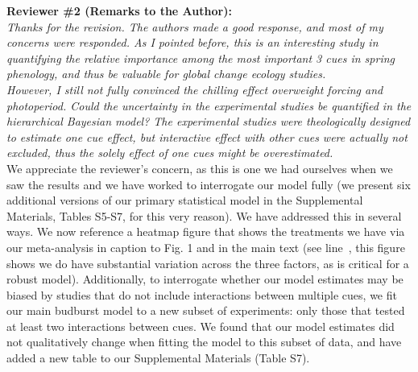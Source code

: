 \documentclass{article}
\newcommand{\lr}[1]{line~\lineref{#1}}
\begin{document}
{\bf Reviewer \#2 (Remarks to the Author):}\\

\emph{Thanks for the revision. The authors made a good response, and most of my concerns were responded. As I pointed before, this is an interesting study in quantifying the relative importance among the most important 3 cues in spring phenology, and thus be valuable for global change ecology studies. }\\


\emph{However, I still not fully convinced the chilling effect overweight forcing and photoperiod. Could the uncertainty in the experimental studies be quantified in the hierarchical Bayesian model? The experimental studies were theologically designed to estimate one cue effect, but interactive effect with other cues were actually not excluded, thus the solely effect of one cues might be overestimated.}\\ 


We appreciate the reviewer's concern, as this is one we had ourselves when we saw the results and we have worked to interrogate our model fully (we present six additional versions of our primary statistical model in the Supplemental Materials, Tables S5-S7, for this very reason). We have addressed this in several ways. We now reference a heatmap figure that shows the treatments we have via our meta-analysis in  caption to Fig. 1 and in the main text (see \lr{heatmap}, this figure shows we do have substantial variation across the three factors, as is critical for a robust model). Additionally, to interrogate whether our model estimates may be biased by studies that do not include interactions between multiple cues, we fit our main budburst model to a new subset of experiments: only those that tested at least two interactions between cues. We found that our model estimates did not qualitatively change when fitting the model to this subset of data, and have added a new table to our Supplemental Materials (Table S7).\\
\end{document}
